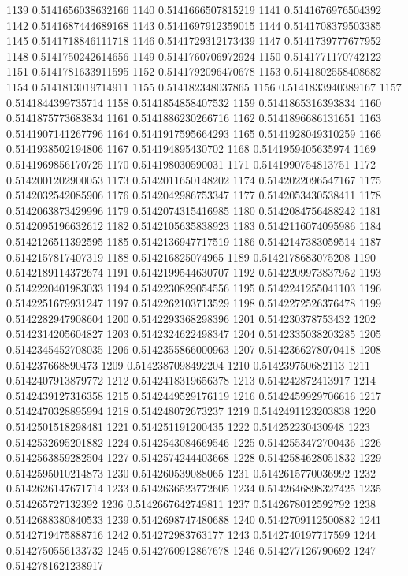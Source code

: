 1139 0.5141656038632166
1140 0.5141666507815219
1141 0.5141676976504392
1142 0.5141687444689168
1143 0.5141697912359015
1144 0.5141708379503385
1145 0.5141718846111718
1146 0.5141729312173439
1147 0.5141739777677952
1148 0.5141750242614656
1149 0.5141760706972924
1150 0.5141771170742122
1151 0.5141781633911595
1152 0.5141792096470678
1153 0.5141802558408682
1154 0.5141813019714911
1155 0.514182348037865
1156 0.5141833940389167
1157 0.5141844399735714
1158 0.5141854858407532
1159 0.5141865316393834
1160 0.5141875773683834
1161 0.5141886230266716
1162 0.5141896686131651
1163 0.5141907141267796
1164 0.5141917595664293
1165 0.5141928049310259
1166 0.5141938502194806
1167 0.514194895430702
1168 0.5141959405635974
1169 0.5141969856170725
1170 0.514198030590031
1171 0.5141990754813751
1172 0.5142001202900053
1173 0.5142011650148202
1174 0.5142022096547167
1175 0.5142032542085906
1176 0.5142042986753347
1177 0.5142053430538411
1178 0.5142063873429996
1179 0.5142074315416985
1180 0.5142084756488242
1181 0.5142095196632612
1182 0.5142105635838923
1183 0.5142116074095986
1184 0.5142126511392595
1185 0.5142136947717519
1186 0.5142147383059514
1187 0.5142157817407319
1188 0.514216825074965
1189 0.5142178683075208
1190 0.5142189114372674
1191 0.5142199544630707
1192 0.5142209973837952
1193 0.5142220401983033
1194 0.5142230829054556
1195 0.5142241255041103
1196 0.5142251679931247
1197 0.5142262103713529
1198 0.5142272526376478
1199 0.5142282947908604
1200 0.5142293368298396
1201 0.514230378753432
1202 0.5142314205604827
1203 0.5142324622498347
1204 0.5142335038203285
1205 0.5142345452708035
1206 0.5142355866000963
1207 0.5142366278070418
1208 0.514237668890473
1209 0.5142387098492204
1210 0.514239750682113
1211 0.5142407913879772
1212 0.5142418319656378
1213 0.514242872413917
1214 0.5142439127316358
1215 0.5142449529176119
1216 0.5142459929706616
1217 0.5142470328895994
1218 0.514248072673237
1219 0.5142491123203838
1220 0.5142501518298481
1221 0.514251191200435
1222 0.514252230430948
1223 0.5142532695201882
1224 0.5142543084669546
1225 0.5142553472700436
1226 0.5142563859282504
1227 0.5142574244403668
1228 0.5142584628051832
1229 0.5142595010214873
1230 0.514260539088065
1231 0.5142615770036992
1232 0.5142626147671714
1233 0.5142636523772605
1234 0.5142646898327425
1235 0.514265727132392
1236 0.5142667642749811
1237 0.5142678012592792
1238 0.5142688380840533
1239 0.5142698747480688
1240 0.5142709112500882
1241 0.5142719475888716
1242 0.514272983763177
1243 0.5142740197717599
1244 0.5142750556133732
1245 0.5142760912867678
1246 0.514277126790692
1247 0.5142781621238917
